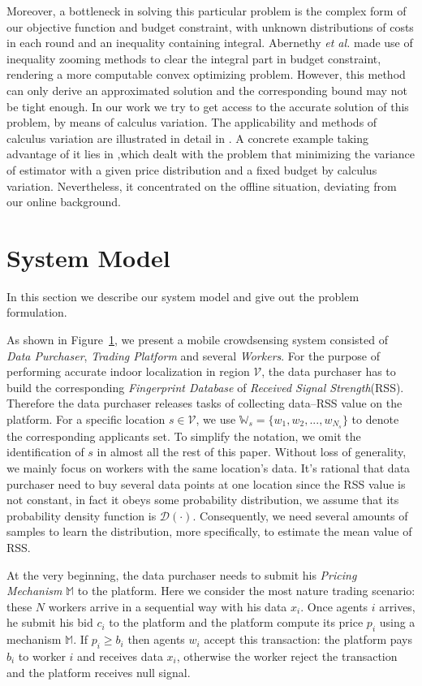 \documentclass[10pt,conference,compsocconf,letterpaper]{IEEEtran}
\begin{document}
\indent Moreover, a bottleneck in solving this particular problem is the complex form of our objective function and budget constraint, with unknown distributions of costs in each round and an inequality containing integral. Abernethy \emph{et al.} made use of inequality zooming methods to clear the integral part in budget constraint, rendering a more computable convex optimizing problem\cite{abernethy2015low}. However, this method can only derive an approximated solution and the corresponding bound may not be tight enough. In our work we try to get access to the accurate solution of this problem, by means of calculus variation. The applicability and methods of calculus variation are illustrated in detail in \cite{liberzon2012calculus}  . A concrete example taking advantage of it lies in \cite{roth2012conducting},which dealt with the problem that minimizing the variance of estimator with a given price distribution and a fixed budget by calculus variation. Nevertheless, it concentrated on the offline situation, deviating from our online background.

\section{System Model}
In this section we describe our system model and give out the problem formulation.

As shown in Figure~\ref{}, we present a mobile crowdsensing system consisted of \emph{Data Purchaser}, \emph{Trading Platform} and several \emph{Workers}. For the purpose of performing accurate indoor localization in region $\mathcal{V}$, the data purchaser has to build the corresponding \emph{Fingerprint Database} of \emph{Received Signal Strength}(RSS). Therefore the data purchaser releases tasks of collecting data--RSS value on the platform. For a specific location $s\in \mathcal{V}$, we use $\mathds{W}_s=\{w_1,w_2,...,w_{N_s}\}$ to denote the corresponding applicants set. To simplify the notation, we omit the identification of $s$ in almost all the rest of this paper. Without loss of generality, we mainly focus on workers with the same location's data. It's rational that data purchaser need to buy several data points at one location since the RSS value is not constant, in fact it obeys some probability distribution, we assume that its probability density function is $\mathcal{D}(\cdot)$. Consequently, we need several amounts of samples to learn the distribution, more specifically, to estimate the mean value of RSS.

At the very beginning, the data purchaser needs to submit his \emph{Pricing Mechanism} $\mathbb{M}$ to the platform. Here we consider the most nature trading scenario: these $N$ workers arrive in a sequential way with his data $x_i$. Once agents $i$ arrives, he submit his bid $c_i$ to the platform and the platform compute its price $p_i$ using a mechanism $\mathbb{M}$. If $p_i\geq b_i$ then agents $w_i$ accept this transaction: the platform pays $b_i$ to worker $i$ and receives data $x_i$, otherwise the worker reject the transaction and the platform receives null signal.
\end{document}
